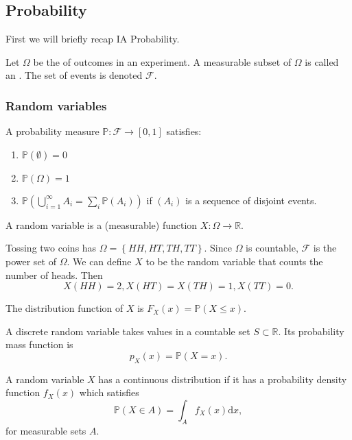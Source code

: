 \documentclass[egregdoesnotlikesansseriftitles,a4paper]{scrartcl}
\begin{document}
\subsection{Probability}
First we will briefly recap IA Probability.

Let $\Omega$ be the  of outcomes in an experiment. A measurable subset of $\Omega$ is called an . The set of events is denoted $\mathcal{F}$. 
\subsubsection*{Random variables}
\begin{definition*}
     A probability measure $\mathbb{P}: \mathcal{F} \rightarrow [0,1]$ satisfies:
     \begin{enumerate}
         \item $\mathbb{P} (\emptyset)=0$ 
         \item $\mathbb{P}(\Omega)=1$
         \item $\mathbb{P}\left(\bigcup_{i=1}^{\infty} A_i= \sum_{i}^{}\mathbb{P} (A_i)\right)$ if $(A_i)$ is a sequence of disjoint events.   
     \end{enumerate} 
\end{definition*}
\begin{definition*}
     A random variable is a (measurable) function $X: \Omega \rightarrow \mathbb{R}$.
\end{definition*}
\begin{example*}
     Tossing two coins has $\Omega= \left\{HH,HT,TH,TT\right\}$. Since $\Omega$ is countable, $\mathcal{F}$ is the power set of $\Omega$. We can define $X$ to be the random variable that counts the number of heads. Then \[
     X (HH)=2, X (HT)=X (TH)=1, X (TT)=0
     .\] 
\end{example*}
\begin{definition*}
     The distribution function of $X$ is $F_X (x)=\mathbb{P} (X \leq x)$.
\end{definition*}
\begin{definition*}
     A discrete random variable takes values in a countable set $S \subset \mathbb{R}$. Its probability mass function is \[
          p_X (x)=\mathbb{P}(X=x)
          .\] 
     
     A random variable $X$ has a continuous distribution if it has a probability density function $f_X (x)$ which satisfies \[
          \mathbb{P} (X \in A)=\int_A f_X (x) \mathrm{d}x
     ,\]
     for measurable sets $A$. 
\end{definition*}
\end{document}
